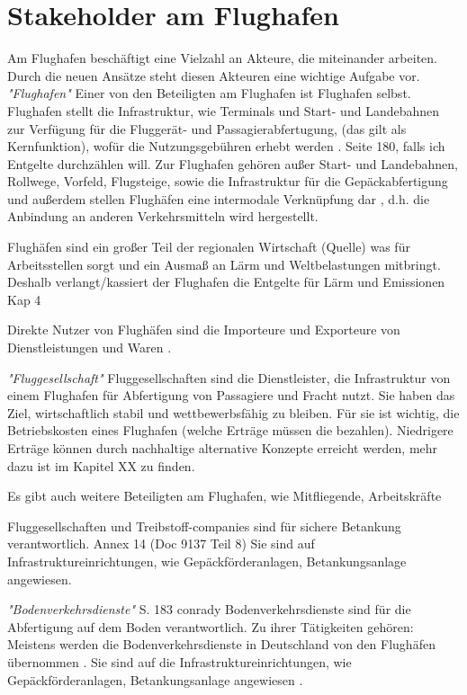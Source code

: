 \section{Stakeholder am Flughafen}
Am Flughafen beschäftigt eine Vielzahl an Akteure, die miteinander arbeiten. Durch die neuen Ansätze steht diesen Akteuren eine 
wichtige Aufgabe vor.
\textit{"Flughafen"}
Einer von den Beteiligten am Flughafen ist Flughafen selbst. 
Flughafen stellt die Infrastruktur, wie Terminals und Start- und Landebahnen zur Verfügung für die Fluggerät- und Passagierabfertugung, 
(das gilt als Kernfunktion), wofür die Nutzungsgebühren erhebt werden \cite{conrady2019luftverkehr}. Seite 180, falls ich Entgelte durchzählen will.
Zur Flughafen gehören außer Start- und Landebahnen, Rollwege, Vorfeld, Flugsteige, sowie die Infrastruktur für die Gepäckabfertigung und 
außerdem stellen Flughäfen eine intermodale Verknüpfung dar \cite{conrady2019luftverkehr}, d.h. die Anbindung an anderen Verkehrsmitteln wird hergestellt.

Flughäfen sind ein großer Teil der regionalen Wirtschaft (Quelle) was für Arbeitsstellen sorgt und ein Ausmaß an Lärm und Weltbelastungen mitbringt.
Deshalb verlangt/kassiert der Flughafen die Entgelte für Lärm und Emissionen Kap 4

Direkte Nutzer von Flughäfen sind die Importeure und Exporteure von Dienstleistungen und Waren \cite{schaar2010analysis}. 

\textit{"Fluggesellschaft"}
Fluggesellschaften sind die Dienstleister, die Infrastruktur von einem Flughafen für Abfertigung von Passagiere und Fracht nutzt. 
Sie haben das Ziel, wirtschaftlich stabil und wettbewerbsfähig zu bleiben. Für sie ist wichtig, die Betriebskosten 
eines Flughafen \cite{schaar2010analysis} (welche Erträge müssen die bezahlen). Niedrigere Erträge können durch nachhaltige 
alternative Konzepte erreicht werden, mehr dazu ist im Kapitel XX zu finden.

Es gibt auch weitere Beteiligten am Flughafen, wie Mitfliegende, Arbeitskräfte

Fluggesellschaften und Treibstoff-companies sind für sichere Betankung verantwortlich. Annex 14 (Doc 9137 Teil 8)
Sie sind auf Infrastruktureinrichtungen, wie Gepäckförderanlagen, Betankungsanlage angewiesen.

\textit{"Bodenverkehrsdienste"} S. 183 conrady
Bodenverkehrsdienste sind für die Abfertigung auf dem Boden verantwortlich. Zu ihrer Tätigkeiten gehören: 
Meistens werden die Bodenverkehrsdienste in Deutschland von den Flughäfen übernommen \cite{conrady2019luftverkehr}.
Sie sind auf die Infrastruktureinrichtungen, wie Gepäckförderanlagen, Betankungsanlage angewiesen \cite{conrady2019luftverkehr}.


